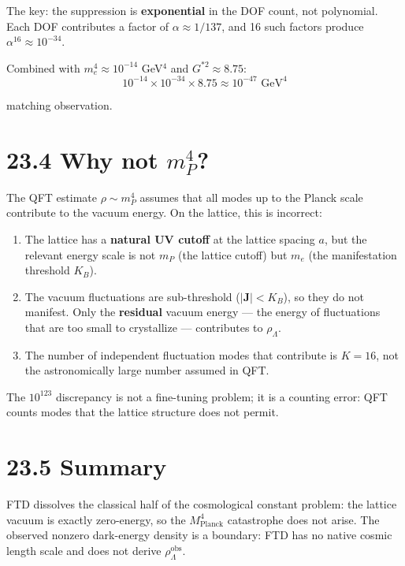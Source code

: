 \documentclass[
  11pt,
  letterpaper,
  twoside,
  openright]{book}
\providecommand{\tightlist}{%
  \setlength{\itemsep}{0pt}\setlength{\parskip}{0pt}}
\begin{document}
The key: the suppression is \textbf{exponential} in the DOF count, not
polynomial. Each DOF contributes a factor of \(\alpha \approx 1/137\),
and 16 such factors produce \(\alpha^{16} \approx 10^{-34}\).

Combined with \(m_e^4 \approx 10^{-14}\) GeV\(^4\) and
\(G^{*2} \approx 8.75\): \[
10^{-14} \times 10^{-34} \times 8.75 \approx 10^{-47} \text{ GeV}^4
\]

matching observation.

\section{\texorpdfstring{23.4 Why not
\(m_P^4\)?}{23.4 Why not m\_P\^{}4?}}\label{why-not-m_p4}

The QFT estimate \(\rho \sim m_P^4\) assumes that all modes up to the
Planck scale contribute to the vacuum energy. On the lattice, this is
incorrect:

\begin{enumerate}
\def\labelenumi{\arabic{enumi}.}
\tightlist
\item
  The lattice has a \textbf{natural UV cutoff} at the lattice spacing
  \(a\), but the relevant energy scale is not \(m_P\) (the lattice
  cutoff) but \(m_e\) (the manifestation threshold \(K_B\)).
\item
  The vacuum fluctuations are sub-threshold (\(|\mathbf{J}| < K_B\)), so
  they do not manifest. Only the \textbf{residual} vacuum energy --- the
  energy of fluctuations that are too small to crystallize ---
  contributes to \(\rho_\Lambda\).
\item
  The number of independent fluctuation modes that contribute is
  \(K = 16\), not the astronomically large number assumed in QFT.
\end{enumerate}

The \(10^{123}\) discrepancy is not a fine-tuning problem; it is a
counting error: QFT counts modes that the lattice structure does not
permit.

\section{23.5 Summary}\label{summary-2}

FTD dissolves the classical half of the cosmological constant problem:
the lattice vacuum is exactly zero-energy, so the \(M_\text{Planck}^4\)
catastrophe does not arise. The observed nonzero dark-energy density is
a boundary: FTD has no native cosmic length scale and does not derive
\(\rho_\Lambda^\text{obs}\).
\end{document}
